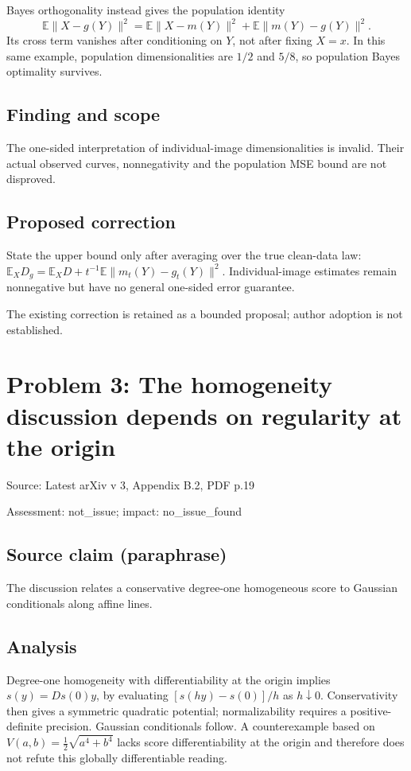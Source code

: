 \documentclass[11pt]{article}
\begin{document}
Bayes orthogonality instead gives the population identity \[\mathbb E\|X-g(Y)\|^2=\mathbb E\|X-m(Y)\|^2+\mathbb E\|m(Y)-g(Y)\|^2.\] Its cross term vanishes after conditioning on \(Y\), not after fixing \(X=x\). In this same example, population dimensionalities are \(1/2\) and \(5/8\), so population Bayes optimality survives.

\subsection*{Finding and scope}

The one-sided interpretation of individual-image dimensionalities is invalid. Their actual observed curves, nonnegativity and the population MSE bound are not disproved.

\subsection*{Proposed correction}

State the upper bound only after averaging over the true clean-data law: \(\mathbb E_XD_g=\mathbb E_XD+t^{-1}\mathbb E\|m_t(Y)-g_t(Y)\|^2\). Individual-image estimates remain nonnegative but have no general one-sided error guarantee.

The existing correction is retained as a bounded proposal; author adoption is not established.

\section*{Problem 3: The homogeneity discussion depends on regularity at the origin}

Source: Latest arXiv v 3, Appendix B.2, PDF p.19

Assessment: not\_issue; impact: no\_issue\_found

\subsection*{Source claim (paraphrase)}

The discussion relates a conservative degree-one homogeneous score to Gaussian conditionals along affine lines.

\subsection*{Analysis}

Degree-one homogeneity with differentiability at the origin implies \(s(y)=Ds(0)y\), by evaluating \([s(hy)-s(0)]/h\) as \(h\downarrow0\). Conservativity then gives a symmetric quadratic potential; normalizability requires a positive-definite precision. Gaussian conditionals follow. A counterexample based on \(V(a,b)=\tfrac12\sqrt{a^4+b^4}\) lacks score differentiability at the origin and therefore does not refute this globally differentiable reading.
\end{document}
